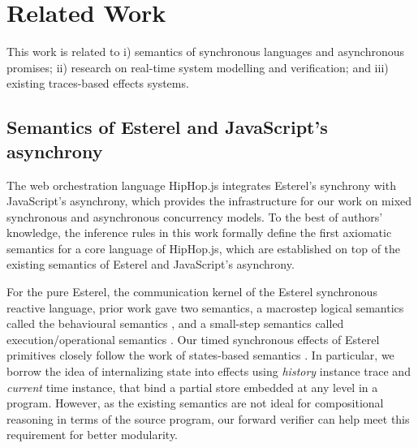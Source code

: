 \documentclass[acmsmall,review,anonymous]{acmart}\settopmatter{printfolios=true,printccs=false,printacmref=false}
\begin{document}
\section{Related Work}\label{sec:Related_work}

This work is related to i) semantics of synchronous languages and asynchronous promises; ii) research on real-time system modelling and verification; and iii) existing traces-based effects systems. 





\subsection{Semantics of Esterel and JavaScript's asynchrony} 
% 
The web orchestration language HipHop.js \cite{berry2020hiphop} integrates Esterel’s synchrony with JavaScript’s asynchrony, which provides the infrastructure for our work on mixed synchronous and asynchronous concurrency models. To the best of authors' knowledge, the inference rules in this work formally define the first axiomatic semantics for a core language of HipHop.js, which are established on top of the existing semantics of Esterel and JavaScript's asynchrony. 




For the pure Esterel, the communication kernel of the Esterel synchronous reactive language, 
prior work gave two semantics, a macrostep logical semantics called the behavioural semantics \cite{berry1999constructive}, and a small-step semantics called execution/operational semantics \cite{berry1992esterel}. 
Our timed synchronous effects of Esterel primitives closely follow the work of states-based semantics \cite{berry1999constructive}. In particular, we borrow the idea of internalizing state into effects using \emph{history} instance trace and \emph{current} time instance, that bind a partial store embedded at any level in a program. However, as the existing semantics are not ideal for compositional reasoning in terms of the source program, our forward verifier can help meet 
this requirement for better modularity. 
\end{document}

